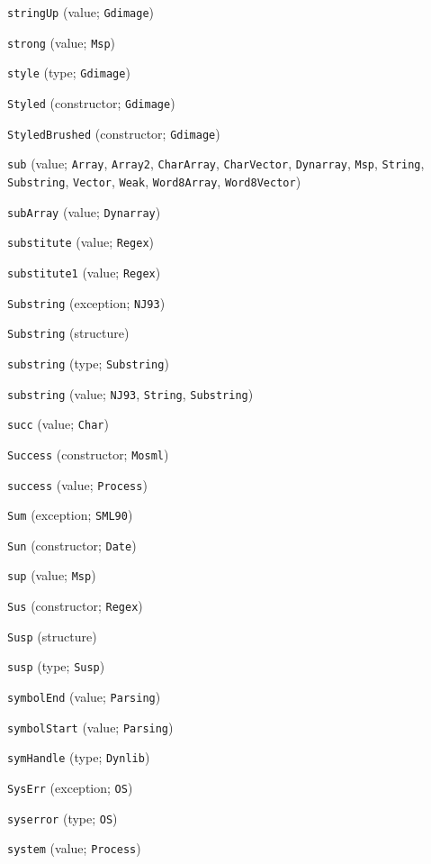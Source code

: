 \begin{description}
\item[] \verb"stringUp" (value; \verb"Gdimage")
\item[] \verb"strong" (value; \verb"Msp")
\item[] \verb"style" (type; \verb"Gdimage")
\item[] \verb"Styled" (constructor; \verb"Gdimage")
\item[] \verb"StyledBrushed" (constructor; \verb"Gdimage")
\item[] \verb"sub" (value; \verb"Array", \verb"Array2", \verb"CharArray", \verb"CharVector", \verb"Dynarray", \verb"Msp", \verb"String", \verb"Substring", \verb"Vector", \verb"Weak", \verb"Word8Array", \verb"Word8Vector")
\item[] \verb"subArray" (value; \verb"Dynarray")
\item[] \verb"substitute" (value; \verb"Regex")
\item[] \verb"substitute1" (value; \verb"Regex")
\item[] \verb"Substring" (exception; \verb"NJ93")
\item[] \verb"Substring" (structure)
\item[] \verb"substring" (type; \verb"Substring")
\item[] \verb"substring" (value; \verb"NJ93", \verb"String", \verb"Substring")
\item[] \verb"succ" (value; \verb"Char")
\item[] \verb"Success" (constructor; \verb"Mosml")
\item[] \verb"success" (value; \verb"Process")
\item[] \verb"Sum" (exception; \verb"SML90")
\item[] \verb"Sun" (constructor; \verb"Date")
\item[] \verb"sup" (value; \verb"Msp")
\item[] \verb"Sus" (constructor; \verb"Regex")
\item[] \verb"Susp" (structure)
\item[] \verb"susp" (type; \verb"Susp")
\item[] \verb"symbolEnd" (value; \verb"Parsing")
\item[] \verb"symbolStart" (value; \verb"Parsing")
\item[] \verb"symHandle" (type; \verb"Dynlib")
\item[] \verb"SysErr" (exception; \verb"OS")
\item[] \verb"syserror" (type; \verb"OS")
\item[] \verb"system" (value; \verb"Process")
\\[2ex]


\end{description}
